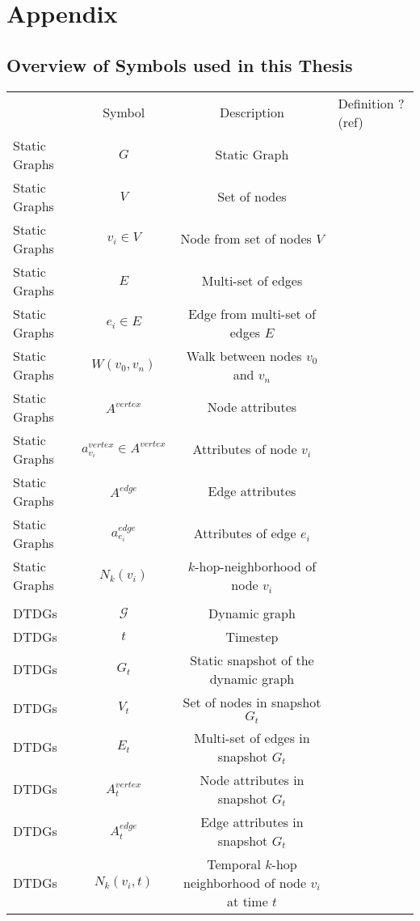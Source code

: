 \section{Appendix}


\subsection{Overview of Symbols used in this Thesis}
\label{s_Appendix_Symbols}

\begin{table}
    \centering
    \begin{tabular}{lccl}
          &Symbol& Description &Definition ? (ref)\\
          Static Graphs&$G$&  Static Graph&\\
          Static Graphs&$V$&  Set of nodes&\\
          Static Graphs&$v_i \in V$&  Node from set of nodes $V$&\\
          Static Graphs&$E$&  Multi-set of edges&\\
          Static Graphs&$e_i \in E$&  Edge from multi-set of edges $E$&\\
          Static Graphs&$W(v_0, v_n)$&  Walk between nodes $v_0$ and $v_n$&\\
          Static Graphs&$A^{vertex}$&  Node attributes&\\
          Static Graphs&$a^{vertex}_{v_i} \in A^{vertex}$&  Attributes of node $v_i$&\\
          Static Graphs&$A^{edge}$&  Edge attributes&\\
 Static Graphs& $a^{edge}_{e_i}$& Attributes of edge $e_i$&\\
 Static Graphs& $N_k(v_i)$& $k$-hop-neighborhood of node $v_i$&\\
 & & &\\
 DTDGs& $\mathcal{G}$& Dynamic graph&\\
 DTDGs& $t$& Timestep&\\
 DTDGs& $G_t$& Static snapshot of the dynamic graph&\\
 DTDGs& $V_t$& Set of nodes in snapshot $G_t$&\\
 DTDGs& $E_t$& Multi-set of edges in snapshot $G_t$&\\
 DTDGs& $A^{vertex}_t$& Node attributes in snapshot $G_t$&\\
 DTDGs& $A_t^{edge}$& Edge attributes in snapshot $G_t$&\\
 DTDGs& $N_k(v_i, t)$& Temporal $k$-hop neighborhood of node $v_i$ at time $t$&\\

\end{tabular}
\end{table}
